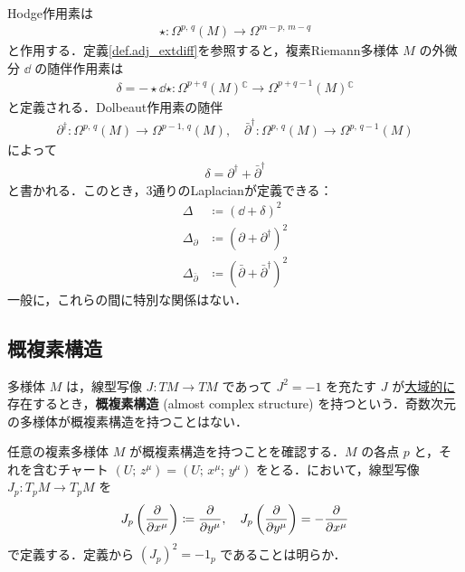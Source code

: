 \documentclass[geometry_main]{subfiles}
\begin{document}
Hodge作用素は
\begin{align} 
	\star \colon \Omega^{p,\, q}(M) \to \Omega^{m-p,\, m-q}
\end{align}
と作用する．定義\ref{def.adj_extdiff}を参照すると，複素Riemann多様体 $M$ の外微分 $\dd{}$ の随伴作用素は
\begin{align} 
	\delta = - \star \dd{} \star \colon \Omega^{p+q}(M){}^\mathbb{C} \to \Omega^{p+q-1}(M){}^\mathbb{C}
\end{align}
と定義される．Dolbeaut作用素の随伴
\begin{align} 
	\partial^\dagger \colon \Omega^{p,\, q}(M) \to \Omega^{p-1,\, q}(M),\quad \bar{\partial}^\dagger \colon \Omega^{p,\, q}(M) \to \Omega^{p,\, q-1}(M)
\end{align}
によって
\begin{align} 
	\delta = \partial^\dagger + \bar{\partial}^\dagger
\end{align}
と書かれる．このとき，3通りのLaplacianが定義できる：
\begin{align} 
	\Delta &\coloneqq (\dd{} + \delta)^2 \\
	\Delta_{\partial} &\coloneqq (\partial + \partial^\dagger)^2 \\
	\Delta_{\bar{\partial}} &\coloneqq (\bar{\partial} + \bar{\partial}^\dagger)^2 
\end{align}
一般に，これらの間に特別な関係はない．

\subsection{概複素構造}

多様体 $M$ は，線型写像 $J \colon TM \to TM$ であって $J^2 = -1$ を充たす $J$ が\underline{大域的に}存在するとき，\textbf{概複素構造} (almost complex structure) を持つという．奇数次元の多様体が概複素構造を持つことはない．

任意の複素多様体 $M$ が概複素構造を持つことを確認する．$M$ の各点 $p$ と，それを含むチャート $(U;\, z^\mu) = (U;\, x^\mu;\, y^\mu)$ をとる．において，線型写像 $J_p \colon T_p M \to T_p M$ を
\begin{align} 
	J_p \left(\pdv{}{x^\mu}\right) \coloneqq \pdv{}{y^\mu},\quad J_p \left(\pdv{}{y^\mu}\right) = -\pdv{}{x^\mu}
\end{align}
で定義する．定義から $(J_p)^2 = -1_p$ であることは明らか．
\end{document}
